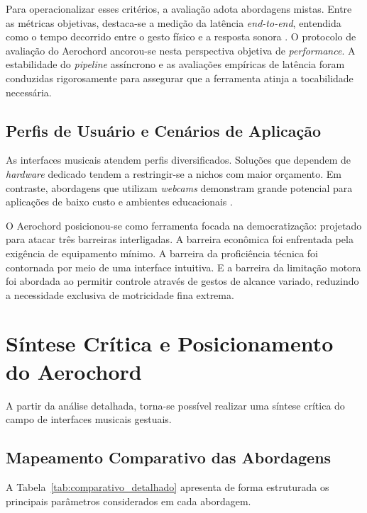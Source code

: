 Para operacionalizar esses critérios, a avaliação adota abordagens mistas. Entre as métricas objetivas, destaca-se a medição da latência \textit{end-to-end}, entendida como o tempo decorrido entre o gesto físico e a resposta sonora \cite{lugaresi2019mediapipe, hassan2019gestureaudio}. O protocolo de avaliação do Aerochord ancorou-se nesta perspectiva objetiva de \textit{performance}. A estabilidade do \textit{pipeline} assíncrono e as avaliações empíricas de latência foram conduzidas rigorosamente para assegurar que a ferramenta atinja a tocabilidade necessária.

\subsection{Perfis de Usuário e Cenários de Aplicação}
\label{subsec:perfis_cenarios}

As interfaces musicais atendem perfis diversificados. Soluções que dependem de \textit{hardware} dedicado tendem a restringir-se a nichos com maior orçamento. Em contraste, abordagens que utilizam \textit{webcams} demonstram grande potencial para aplicações de baixo custo e ambientes educacionais \cite{americo2020hyperharp, vamvakousis2016eyeharp}.

O Aerochord posicionou-se como ferramenta focada na democratização: projetado para atacar três barreiras interligadas. A barreira econômica foi enfrentada pela exigência de equipamento mínimo. A barreira da proficiência técnica foi contornada por meio de uma interface intuitiva. E a barreira da limitação motora foi abordada ao permitir controle através de gestos de alcance variado, reduzindo a necessidade exclusiva de motricidade fina extrema.

\section{Síntese Crítica e Posicionamento do Aerochord}
\label{sec:sintese_critica}

A partir da análise detalhada, torna-se possível realizar uma síntese crítica do campo de interfaces musicais gestuais.

\subsection{Mapeamento Comparativo das Abordagens}
\label{subsec:comparativo_abordagens}

A Tabela~\ref{tab:comparativo_detalhado} apresenta de forma estruturada os principais parâmetros considerados em cada abordagem.

